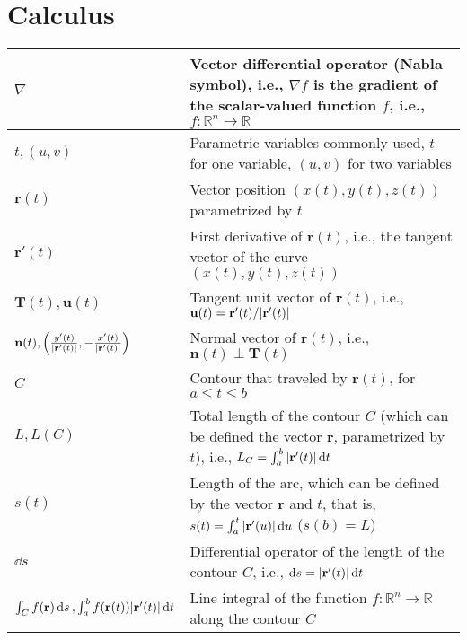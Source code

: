 \documentclass{article}
\begin{document}
\section{Calculus}
\begin{xltabular}{\textwidth}{XX}
    \(\nabla\) & Vector differential operator (Nabla symbol), i.e., \(\nabla f\) is the gradient of the scalar-valued function \(f\), i.e., \(f: \mathbb{R}^n \rightarrow \mathbb{R}\) \\ \hline
    \(t, (u,v)\) & Parametric variables commonly used, \(t\) for one variable, \((u,v)\) for two variables\cite{stewartCalculus2011}\\ \hline
    \(\mathbf{r}(t)\) & Vector position \((x(t), y(t), z(t))\) parametrized by \(t\)\cite{stewartCalculus2011}\\ \hline
    \(\mathbf{r}'(t)\) & First derivative of \(\mathbf{r}(t)\), i.e., the tangent vector of the curve \((x(t), y(t), z(t))\) \cite{stewartCalculus2011}\\ \hline
    \(\mathbf{T}(t), \mathbf{u}(t)\) & Tangent unit vector of \(\mathbf{r}(t)\), i.e., \newline  \(\mathbf{u}(t) = \mathbf{r}'(t)/\abs{\mathbf{r}'(t)}\)\cite{stewartCalculus2011,kreyszigAdvancedEngineeringMathematics2008}\\ \hline
    \(\mathbf{n}(t), \left( \frac{y'(t)}{\abs{\mathbf{r}'(t)}}, -\frac{x'(t)}{\abs{\mathbf{r}'(t)}} \right)\) & Normal vector of \(\mathbf{r}(t)\), i.e., \newline \(\mathbf{n}(t)\perp \mathbf{T}(t) \)\cite{stewartCalculus2011}\\ \hline
    \(C\)& Contour that traveled by \(\mathbf{r}(t)\), for \(a \leq t \leq b\) \cite{stewartCalculus2011}\\ \hline
    \(L, L(C)\) & Total length of the contour \(C\) (which can be defined the vector \(\mathbf{r}\), parametrized by \(t\)), i.e., \(L_C = \int_a^b \abs{\mathbf{r}'(t)} \dd{t}\)\cite{stewartCalculus2011}\\ \hline
    \(s(t)\) & Length of the arc, which can be defined by the vector \(\mathbf{r}\) and \(t\), that is, \(s(t) = \int_a^t \abs{\mathbf{r}'(u)} \dd{u}\) (\(s(b) = L\))\cite{stewartCalculus2011}\\ \hline
    \(\dd{s}\) & Differential operator of the length of the contour \(C\), i.e., \(\dd{s} = \abs{\mathbf{r}'(t)} \dd{t}\)\\ \hline
    \(\int_C f(\mathbf{r}) \dd{s}, \int_a^b f(\mathbf{r}(t)) \abs{\mathbf{r}'(t)} \dd{t}\) & Line integral of the function \(f: \mathbb{R}^{n} \rightarrow \mathbb{R}\) along the contour \(C\) \cite{apostolCalculus2ndEdn1967,stewartCalculus2011} \\ \hline

\end{xltabular}
\end{document}
